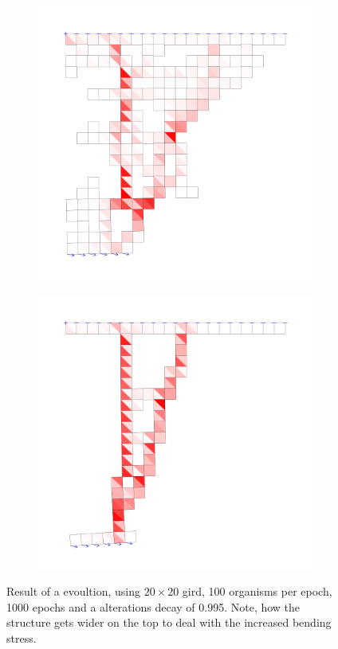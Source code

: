 \documentclass[12pt]{article}
\begin{document}
\begin{figure}[p]
    \begin{subfigure}[b]{0.5\textwidth}
        \includegraphics[width=\linewidth]{images/debug1500.png} 
    \end{subfigure}%
    \begin{subfigure}[b]{0.5\textwidth}
        \includegraphics[width=\linewidth]{images/debug8625.png} 
    \end{subfigure}
    \caption{Result of a evoultion, using $20\times20$ gird, 100 organisms per epoch, 1000 epochs and a alterations decay of 0.995. Note, how the structure gets wider on the top to deal with the increased bending stress.}
    \label{fig:Evolution}
\end{figure}
\end{document}
